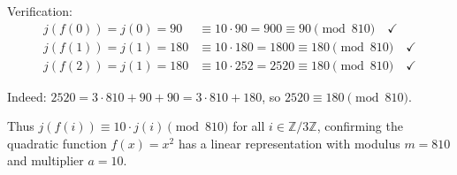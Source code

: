\begin{remark}
Verification:
\begin{align*}
j(f(0)) = j(0) = 90 &\equiv 10 \cdot 90 = 900 \equiv 90 \pmod{810} \quad\checkmark \\
j(f(1)) = j(1) = 180 &\equiv 10 \cdot 180 = 1800 \equiv 180 \pmod{810} \quad\checkmark \\
j(f(2)) = j(1) = 180 &\equiv 10 \cdot 252 = 2520 \equiv 180 \pmod{810} \quad\checkmark
\end{align*}

Indeed: $2520 = 3 \cdot 810 + 90 + 90 = 3 \cdot 810 + 180$, so $2520 \equiv 180 \pmod{810}$.

Thus $j(f(i)) \equiv 10 \cdot j(i) \pmod{810}$ for all $i \in \mathbb{Z}/3\mathbb{Z}$, confirming the quadratic function $f(x) = x^2$ has a linear representation with modulus $m = 810$ and multiplier $a = 10$.
\end{remark}
